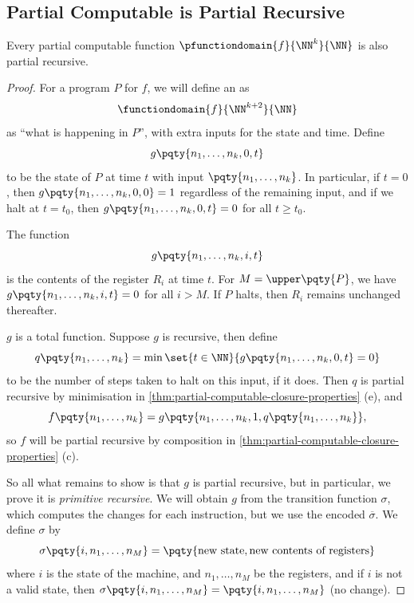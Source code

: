 \subsection{Partial Computable is Partial Recursive}

\begin{theorem}
    \label{thm:partial-computable-partial-recursive}%
    Every partial computable function \(\pfunctiondomain{f}{\NN^k}{\NN}\) is also partial recursive.
\end{theorem}

\begin{proof}
    For a program \(P\) for \(f\), we will define an  as
    \[
        \functiondomain{f}{\NN^{k + 2}}{\NN}
    \]
    as ``what is happening in \(P\)'', with extra inputs for the state and time. Define
    \[
        g\pqty{n_1, \ldots, n_k, 0, t}
    \]
    to be the state of \(P\) at time \(t\) with input \(\pqty{n_1, \ldots, n_k}\). In particular, if \(t = 0\), then \(g\pqty{n_1, \ldots, n_k, 0, 0} = 1\) regardless of the remaining input, and if we halt at \(t = t_0\), then \(g\pqty{n_1, \ldots, n_k, 0, t} = 0\) for all \(t \geq t_0\).

    The function
    \[
        g\pqty{n_1, \ldots, n_k, i, t}
    \]
    is the contents of the register \(R_i\) at time \(t\). For \(M = \upper\pqty{P}\), we have \(g\pqty{n_1, \ldots, n_k, i, t} = 0\) for all \(i > M\). If \(P\) halts, then \(R_i\) remains unchanged thereafter.

    \(g\) is a total function. Suppose \(g\) is recursive, then define
    \[
        q \pqty{n_1, \ldots, n_k} = \min \set{t \in \NN}{g\pqty{n_1, \ldots, n_k, 0, t} = 0}
    \]
    to be the number of steps taken to halt on this input, if it does. Then \(q\) is partial recursive by minimisation in \autoref{thm:partial-computable-closure-properties} (e), and
    \[
        f\pqty{n_1, \ldots, n_k} = g\pqty{n_1, \ldots, n_k, 1, q\pqty{n_1, \ldots, n_k}},
    \]
    so \(f\) will be partial recursive by composition in \autoref{thm:partial-computable-closure-properties} (c).

    So all what remains to show is that \(g\) is partial recursive, but in particular, we prove it is \emph{primitive recursive}. We will obtain \(g\) from the transition function \(\sigma\), which computes the changes for each instruction, but we use the encoded \(\overline{\sigma}\). We define \(\sigma\) by
    \[
        \sigma\pqty{i, n_1, \ldots, n_M} = \pqty{\text{new state}, \text{new contents of registers}}
    \]
    where \(i\) is the state of the machine, and \(n_1, \ldots, n_M\) be the registers, and if \(i\) is not a valid state, then \(\sigma\pqty{i, n_1, \ldots, n_M} = \pqty{i, n_1, \ldots, n_M}\) (no change).


\end{proof}
